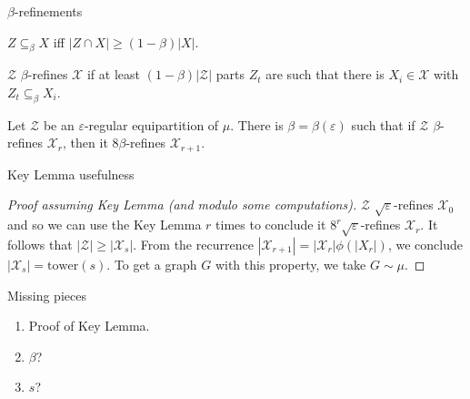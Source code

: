 \documentclass{beamer}
\newcommand{\twr}{\mathrm{tower}}
\newcommand{\1}{\mathbbm{1}}
\newcommand{\X}{\mathcal{X}}
\newcommand{\Z}{\mathcal{Z}}
\newcommand{\eps}{\varepsilon}
\begin{document}
\begin{frame}{$\beta$-refinements}
  \begin{definition}
    $Z \subseteq_\beta X$ iff $|Z \cap X| \ge (1 - \beta)|X|$.
  \end{definition}

  \pause

  \begin{definition}[$\Z$ $\beta$-refining $\X$]
    $\Z$ $\beta$-refines $\X$ if at least $(1 - \beta)|\Z|$ parts $Z_t$ are such that
    there is $X_i \in \X$ with $Z_t \subseteq_\beta X_i$.
  \end{definition}

  \pause

  \begin{lemma}
    Let $\Z$ be an $\eps$-regular equipartition of $\mu$. There is $\beta = \beta(\eps)$
    such that if $\Z$ $\beta$-refines $\X_r$, then it $8\beta$-refines $\X_{r + 1}$.
  \end{lemma}
\end{frame}

\begin{frame}{Key Lemma usefulness}
  \begin{proof}[Proof assuming Key Lemma (and modulo some computations)]
    \pause
    $\Z$ $\sqrt{\eps}$-refines $\X_0$ and so we can use the Key Lemma $r$ times to
    conclude it $8^r \sqrt{\eps}$-refines $\X_r$.
    \pause
    It follows that $|\Z| \ge |\X_s|$.
    \pause
    From the recurrence $|\X_{r + 1}| = |\X_r| \phi(|X_r|)$, we conclude $|\X_s| =
      \twr(s)$.
    \pause
    To get a graph $G$ with this property, we take $G \sim \mu$.
  \end{proof}

  \pause

  \begin{block}{Missing pieces}
    \begin{enumerate}
      \item Proof of Key Lemma.
            \pause
      \item $\beta$?
            \pause
      \item $s$?
    \end{enumerate}
  \end{block}
\end{frame}
\end{document}
